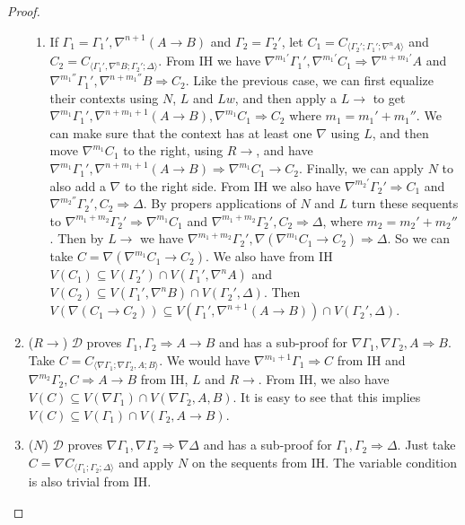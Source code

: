 \begin{proof}
\begin{enumerate}
\begin{enumerate}
			\item If $\Gamma_1 = \Gamma_1' , \nabla^{n+1} (A \rightarrow B)$ and $\Gamma_2 = \Gamma_2'$, let $C_1 = C_{\langle\Gamma_2';\Gamma_1';\nabla^n A\rangle}$ and $C_2 = C_{\langle\Gamma_1',\nabla^n B;\Gamma_2';\Delta\rangle}$.
			From IH we have $\nabla^{m_1'} \Gamma_1', \nabla^{m_1'} C_1 \Rightarrow \nabla^{n+m_1'} A$ and $\nabla^{m_1''} \Gamma_1',\nabla^{n+m_1''} B \Rightarrow C_2$. Like the previous case, we can first equalize their contexts using $N$, $L$ and $Lw$, and then apply a $L\rightarrow$ to get $\nabla^{m_1} \Gamma_1',\nabla^{n+m_1+1}(A \rightarrow B) , \nabla^{m_1} C_1 \Rightarrow C_2$ where $m_1 = m_1'+m_1''$. We can make sure that the context has at least one $\nabla$ using $L$, and then move $\nabla^{m_1} C_1$ to the right, using $R\rightarrow$, and have $\nabla^{m_1} \Gamma_1',\nabla^{n+m_1+1}(A \rightarrow B) \Rightarrow \nabla^{m_1} C_1 \rightarrow C_2$. Finally, we can apply $N$ to also add a $\nabla$ to the right side.
			From IH we also have $\nabla^{m_2'} \Gamma_2' \Rightarrow C_1$ and $\nabla^{m_2''} \Gamma_2' , C_2 \Rightarrow \Delta$. By propers applications of $N$ and $L$ turn these sequents to $\nabla^{m_1+m_2} \Gamma_2' \Rightarrow \nabla^{m_1} C_1$ and $\nabla^{m_1+m_2} \Gamma_2' , C_2 \Rightarrow \Delta$, where $m_2 = m_2'+m_2''$. Then by $L\rightarrow$ we have $\nabla^{m_1+m_2} \Gamma_2' , \nabla (\nabla^{m_1} C_1 \rightarrow C_2) \Rightarrow \Delta$. So we can take $C = \nabla (\nabla^{m_1} C_1 \rightarrow C_2)$. We also have from IH $V(C_1) \subseteq V(\Gamma_2') \cap V(\Gamma_1' , \nabla^n A)$ and $V(C_2) \subseteq V(\Gamma_1' , \nabla^n B) \cap V(\Gamma_2' , \Delta)$. Then $V(\nabla (C_1 \rightarrow C_2)) \subseteq V(\Gamma_1' , \nabla^{n+1} (A \rightarrow B)) \cap V(\Gamma_2' , \Delta)$.
		\end{enumerate}

		\item ($R\rightarrow$) $\mathcal{D}$ proves $\Gamma_1, \Gamma_2 \Rightarrow A \rightarrow B$ and has a sub-proof for $\nabla \Gamma_1, \nabla \Gamma_2, A \Rightarrow B$. Take $C = C_{\langle\nabla\Gamma_1;\nabla\Gamma_2,A;B\rangle}$. We would have $\nabla^{m_1+1}\Gamma_1 \Rightarrow C$ from IH and $\nabla^{m_2}\Gamma_2, C \Rightarrow A \rightarrow B$ from IH, $L$ and $R\rightarrow$. From IH, we also have $V(C) \subseteq V(\nabla\Gamma_1) \cap V(\nabla\Gamma_2,A,B)$. It is easy to see that this implies $V(C) \subseteq V(\Gamma_1) \cap V(\Gamma_2,A \rightarrow B)$.

		\item ($N$) $\mathcal{D}$ proves $\nabla \Gamma_1 , \nabla \Gamma_2 \Rightarrow \nabla \Delta$ and has a sub-proof for $\Gamma_1 , \Gamma_2 \Rightarrow \Delta$. Just take $C = \nabla C_{\langle\Gamma_1;\Gamma_2;\Delta\rangle}$ and apply $N$ on the sequents from IH. The variable condition is also trivial from IH.
		

\end{enumerate}
\end{proof}
